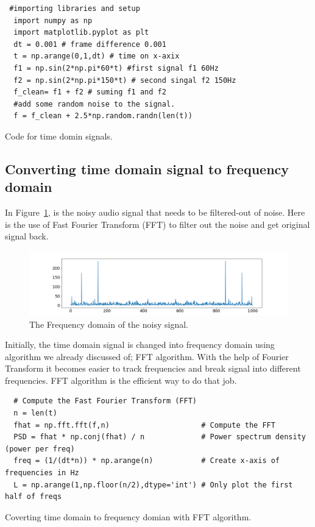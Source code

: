 \documentclass[a4paper, 12pt]{scrartcl}
\begin{document}
\begin{listing}[h]
  \begin{verbatim}
 #importing libraries and setup
  import numpy as np
  import matplotlib.pyplot as plt
  dt = 0.001 # frame difference 0.001
  t = np.arange(0,1,dt) # time on x-axix
  f1 = np.sin(2*np.pi*60*t) #first signal f1 60Hz
  f2 = np.sin(2*np.pi*150*t) # second singal f2 150Hz
  f_clean= f1 + f2 # suming f1 and f2
  #add some random noise to the signal.
  f = f_clean + 2.5*np.random.randn(len(t))
  \end{verbatim}
  \caption{Code for time domin signals.}
  \label{listing:sixty}
  \end{listing}
  
\subsection{Converting time domain signal to frequency domain}

  In Figure~\ref{fig:time_to_freq}, is the noisy audio signal that needs to be filtered-out of noise.
Here is the use of Fast Fourier Transform (FFT) to filter out the noise and get original signal back.
  
\begin{figure}[H] 
  \centering
  \includegraphics[width=\textwidth]{img/time_to_freq.png}
  \caption{The Frequency domain of the noisy signal.}
  \label{fig:time_to_freq}
\end{figure}
Initially, the time domain signal is changed into frequency domain using algorithm we already discussed of; FFT algorithm.
With the help of Fourier Transform it becomes easier to track frequencies and break signal into different frequencies.
FFT algorithm is the efficient way to do that job.

\begin{listing}[h]
  \begin{verbatim}
  # Compute the Fast Fourier Transform (FFT)
  n = len(t)
  fhat = np.fft.fft(f,n)                     # Compute the FFT
  PSD = fhat * np.conj(fhat) / n             # Power spectrum density (power per freq)
  freq = (1/(dt*n)) * np.arange(n)           # Create x-axis of frequencies in Hz
  L = np.arange(1,np.floor(n/2),dtype='int') # Only plot the first half of freqs
  \end{verbatim}
  \caption{Coverting time domain to frequency domian with FFT algorithm.}
  \label{listing:time_to_freq}
  \end{listing}
\end{document}
